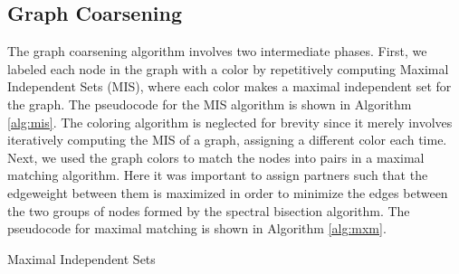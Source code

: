 \documentclass[11pt]{article}
\begin{document}
\subsection{Graph Coarsening}

The graph coarsening algorithm involves two intermediate phases. First, we
labeled each node in the graph with a color by repetitively computing Maximal
Independent Sets (MIS), where each color makes a maximal independent set for the
graph. The pseudocode for the MIS algorithm is shown in
Algorithm \ref{alg:mis}. The coloring algorithm is neglected for brevity since
it merely involves iteratively computing the MIS of a graph, assigning a
different color each time. Next, we used the
graph colors to match the nodes into pairs in a maximal matching algorithm. Here
it was important to assign partners such that the edgeweight between them is
maximized in order to minimize the edges between the two groups of nodes formed
by the spectral bisection algorithm. The pseudocode for maximal matching is
shown in Algorithm \ref{alg:mxm}. 

	\begin{algorithm}[H]
        \small
	\caption{Maximal Independent Sets}\label{alg:mis}
	\begin{algorithmic}[1]
         \\

        \EndParFor


        \Else
        \EndIf
        \EndFor
        \EndParFor

        \EndIf
        \EndParFor

        \EndFor
        \EndParFor

        \EndWhile

	\EndProcedure
	\end{algorithmic}
	\end{algorithm}
\end{document}
